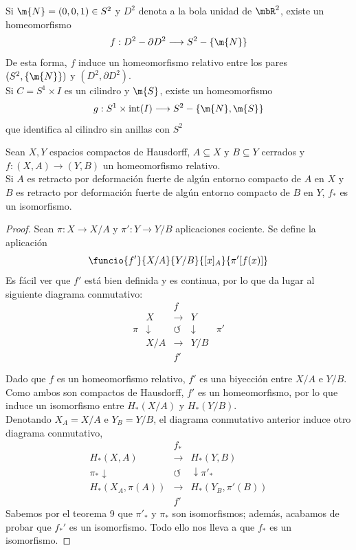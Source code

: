 \begin{ejem}Si $\m{N}=(0,0,1) \in S^2$ y $D^2$ denota a la bola unidad de $\mbR^2$, existe un homeomorfismo $$f: D^2-\partial D^2 \longrightarrow S^2-\{\m{N}\}$$ De esta forma, $f$ induce un homeomorfismo relativo entre los pares $(S^2,\{\m{N}\})$ y $(D^2,\partial D^2)$.
\\

Si $C=S^1\times I$ es un cilindro y $\m{S}$, existe un homeomorfismo $$g: S^1\times \mbox{int}(I) \longrightarrow S^2-\{\m{N},\m{S}\}$$ que identifica al cilindro sin anillas con $S^2$\end{ejem}

\begin{teo}
Sean $X,Y$ espacios compactos de Hausdorff, $A \subseteq X$ y $B \subseteq Y$ cerrados y $f: (X,A) \longrightarrow (Y,B)$ un homeomorfismo relativo.\\

Si $A$ es retracto por deformación fuerte de algún entorno compacto de $A$ en $X$ y $B$ es retracto por deformación fuerte de algún entorno compacto de $B$ en $Y$, $f_*$ es un isomorfismo.
\end{teo}

\begin{proof}Sean $\pi: X \longrightarrow X/A$ y $\pi': Y \longrightarrow Y/B$ aplicaciones cociente. Se define la aplicación $$\funcio{f'}{X/A}{Y/B}{[x]_A}{\pi'[f(x)]}$$ Es fácil ver que $f'$ está bien definida y es continua, por lo que da lugar al siguiente diagrama conmutativo:
\[\begin{array}{ccccc}
   	&			&f        			&          	&\\
   	&X   		&\longrightarrow		&Y       	&\\
\pi	&\downarrow	&\circlearrowleft	&\downarrow	&\pi'\\
   	&X/A			&\longrightarrow		&Y/B      	&\\
    &          	&f'       			&          	&
\end{array}\]

Dado que $f$ es un homeomorfismo relativo, $f'$ es una biyección entre $X/A$ e $Y/B$. Como ambos son compactos de Hausdorff, $f'$ es un homeomorfismo, por lo que induce un isomorfismo entre $H_*(X/A)$ y $H_*(Y/B)$.
\\

Denotando $X_A=X/A$ e $Y_B=Y/B$, el diagrama conmutativo anterior induce otro diagrama conmutativo,
\[\displaystyle\begin{array}{ccc}
				&f_*        			&          		\\
H_*(X,A)   		&\longrightarrow		&H_*(Y,B)   		\\
\pi_*\downarrow	&\circlearrowleft	&\downarrow\pi'_*\\
H_*\left(X_A,\pi(A)\right)	&\longrightarrow		&H_*\left(Y_B,\pi'(B)\right)\\
          		&f'       			&          			
\end{array}\]
Sabemos por el teorema 9 que $\pi'_*$ y $\pi_*$ son isomorfismos; además, acabamos de probar que $f_*'$ es un isomorfismo. Todo ello nos lleva a que $f_*$ es un isomorfismo.
\end{proof}
